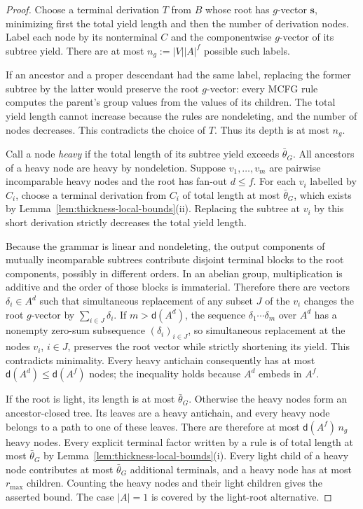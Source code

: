 \documentclass[11pt]{article}
\numberwithin{equation}{section}
\theoremstyle{plain}
\theoremstyle{definition}
\theoremstyle{remark}
\theoremstyle{plain}
\begin{document}
\begin{proof}
Choose a terminal derivation $T$ from $B$ whose
root has $g$-vector $\mathbf s$, minimizing
first the total yield length and then the number
of derivation nodes. Label each node by its
nonterminal $C$ and the componentwise $g$-vector
of its subtree yield. There are at most
$n_g:=|V||A|^f$ possible such labels.

If an ancestor and a proper descendant had
the same label, replacing the former subtree
by the latter would preserve the root
$g$-vector: every MCFG rule computes the
parent's group values from the values of its
children. The total yield length cannot
increase because the rules are nondeleting,
and the number of nodes decreases.
This contradicts the choice of $T$.
Thus its depth is at most $n_g$.

Call a node \emph{heavy} if the total length
of its subtree yield exceeds $\bar\theta_G$.
All ancestors of a heavy node are heavy
by nondeletion. Suppose $v_1,\ldots,v_m$
are pairwise incomparable heavy nodes and
the root has fan-out $d\le f$.
For each $v_i$ labelled by $C_i$,
choose a terminal derivation from $C_i$
of total length at most $\bar\theta_G$,
which exists by
Lemma~\ref{lem:thickness-local-bounds}(ii).
Replacing the subtree at $v_i$ by this
short derivation strictly decreases the
total yield length.

Because the grammar is linear and nondeleting,
the output components of mutually incomparable
subtrees contribute disjoint terminal blocks
to the root components, possibly in different
orders. In an abelian group, multiplication
is additive and the order of those blocks is
immaterial. Therefore there are vectors
$\delta_i\in A^d$ such that simultaneous
replacement of any subset $J$ of the $v_i$
changes the root $g$-vector by
$\sum_{i\in J}\delta_i$.
If $m>\mathsf d(A^d)$, the sequence
$\delta_1\cdots\delta_m$ over $A^d$ has a nonempty
zero-sum subsequence $(\delta_i)_{i\in J}$, so
simultaneous replacement at the nodes $v_i$,
$i\in J$, preserves the root
vector while strictly shortening its yield.
This contradicts minimality. Every heavy
antichain consequently has at most
$\mathsf d(A^d)\le\mathsf d(A^f)$ nodes; the
inequality holds because $A^d$ embeds in $A^f$.

If the root is light, its length is at most
$\bar\theta_G$. Otherwise the heavy nodes
form an ancestor-closed tree. Its leaves
are a heavy antichain, and every heavy node
belongs to a path to one of these leaves.
There are therefore at most
$\mathsf d(A^f)\,n_g$ heavy nodes.
Every explicit terminal factor written by
a rule is of total length at most
$\bar\theta_G$ by
Lemma~\ref{lem:thickness-local-bounds}(i).
Every light child of a heavy node contributes
at most $\bar\theta_G$ additional terminals,
and a heavy node has at most $r_{\max}$
children. Counting the heavy nodes and their
light children gives the asserted bound.
The case $|A|=1$ is covered by the light-root
alternative.
\end{proof}
\end{document}
